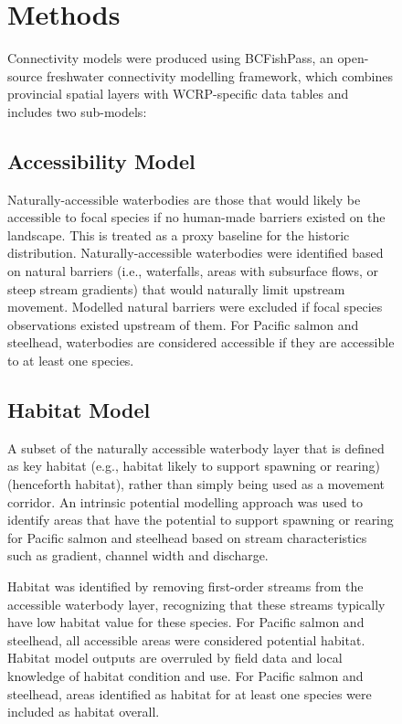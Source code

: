 \documentclass[
  letterpaper,
  DIV=11,
  numbers=noendperiod]{scrreprt}
\begin{document}
\begin{figure}
{\chapter*{Methods}\label{methods}


Connectivity models were produced using BCFishPass, an open-source
freshwater connectivity modelling framework, which combines provincial
spatial layers with WCRP-specific data tables and includes two
sub-models:

\section*{Accessibility Model}\label{accessibility-model}


Naturally-accessible waterbodies are those that would likely be
accessible to focal species if no human-made barriers existed on the
landscape. This is treated as a proxy baseline for the historic
distribution. Naturally-accessible waterbodies were identified based on
natural barriers (i.e., waterfalls, areas with subsurface flows, or
steep stream gradients) that would naturally limit upstream movement.
Modelled natural barriers were excluded if focal species observations
existed upstream of them. For Pacific salmon and steelhead, waterbodies
are considered accessible if they are accessible to at least one
species.

\section*{Habitat Model}\label{habitat-model}


A subset of the naturally accessible waterbody layer that is defined as
key habitat (e.g., habitat likely to support spawning or rearing)
(henceforth habitat), rather than simply being used as a movement
corridor. An intrinsic potential modelling approach was used to identify
areas that have the potential to support spawning or rearing for Pacific
salmon and steelhead based on stream characteristics such as gradient,
channel width and discharge.

Habitat was identified by removing first-order streams from the
accessible waterbody layer, recognizing that these streams typically
have low habitat value for these species. For Pacific salmon and
steelhead, all accessible areas were considered potential habitat.
Habitat model outputs are overruled by field data and local knowledge of
habitat condition and use. For Pacific salmon and steelhead, areas
identified as habitat for at least one species were included as habitat
overall.

}
\end{figure}
\end{document}

